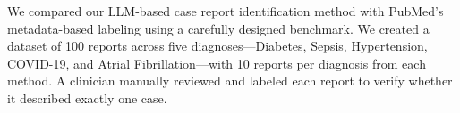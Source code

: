 We compared our LLM-based case report identification method with PubMed's metadata-based labeling using a carefully designed benchmark.
We created a dataset of 100 reports across five diagnoses—Diabetes, Sepsis, Hypertension, COVID-19, and Atrial Fibrillation—with 10 reports per diagnosis from each method.
A clinician manually reviewed and labeled each report to verify whether it described exactly one case.



\par\endgroup
